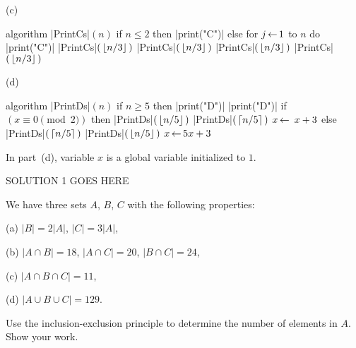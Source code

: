 \documentclass[11pt]{article}
\begin{document}
\begin{problem}
\medskip
\noindent
(c) 
\hspace{0.01in}
%
\begin{minipage}[t]{2.4in}
\strut\vspace*{- 2.5 \baselineskip}\newline 

\begin{program}
algorithm |PrintCs|$(n)$
   if $n\le 2$ then
      |print("C")|
   else
      for $j{\,\leftarrow\,} 1$ to $n$
         do |print("C")|
      |PrintCs|$(\,{\left\lfloor n/3\right\rfloor}\,)$
      |PrintCs|$(\,{\left\lfloor n/3\right\rfloor}\,)$
      |PrintCs|$(\,{\left\lfloor n/3\right\rfloor}\,)$
      |PrintCs|$(\,{\left\lfloor n/3\right\rfloor}\,)$
\end{program}
\end{minipage}
%
\hspace{0.4in}
(d) 
\hspace{0.01in}
%
\begin{minipage}[t]{2.4in}
\strut\vspace*{- 2.5 \baselineskip}\newline 

\begin{program}
algorithm |PrintDs|$(n)$  
   if $n\ge 5$ then
      |print("D")|
      |print("D")|
     if $(x \equiv 0 \pmod 2)$ then 
         |PrintDs|$(\,{\left\lfloor n/5\right\rfloor}\,)$
         |PrintDs|$(\,{\left\lceil n/5\right\rceil}\,)$
         $x{\,\leftarrow\,} \ x + 3$
      else
         |PrintDs|$(\,{\left\lceil n/5\right\rceil}\,)$
         |PrintDs|$(\,{\left\lfloor n/5\right\rfloor}\,)$
         $x{\,\leftarrow\,} 5x + 3$
\end{program}
\end{minipage}

\noindent
In part~(d), variable $x$ is a global variable initialized to $1$.
\end{problem}


\begin{solution}
	SOLUTION 1 GOES HERE
\end{solution}


\newpage
\vspace{0.1in}
\begin{problem}
We have three sets $A$, $B$, $C$ with the following properties:

\begin{description}

\item{(a)}  $|B| = 2|A|$, $|C| = 3|A|$, 


\item{(b)} $|A\cap B| = 18$,
        $|A\cap C| = 20$,
        $|B\cap C| = 24$,

\item{(c)}
$|A\cap B\cap C| = 11$,

\item{(d)}
$|A\cup B\cup C| = 129$.

\end{description}

\noindent Use the inclusion-exclusion principle to determine the number of elements in $A$. 
Show your work.
\end{problem}
\end{document}
